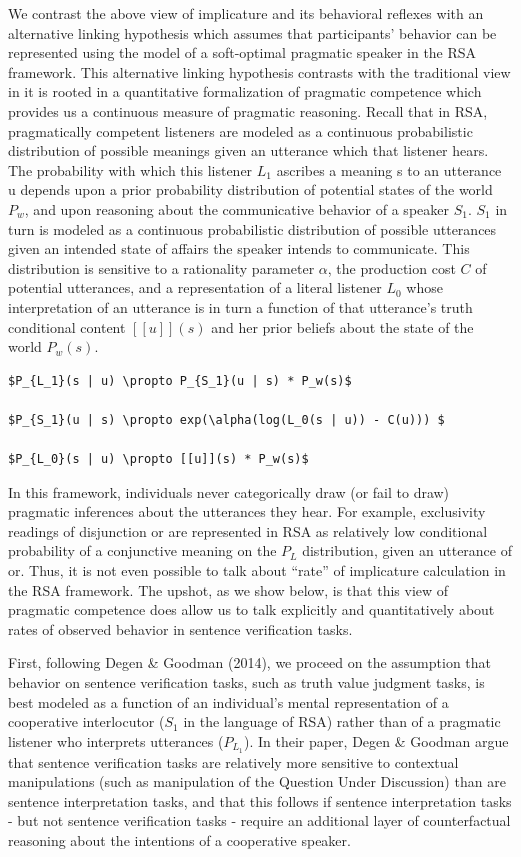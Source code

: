 \documentclass[floatsintext,man]{apa6}
\theoremstyle{definition}
\theoremstyle{definition}
\theoremstyle{definition}
\theoremstyle{remark}
\begin{document}
We contrast the above view of implicature and its behavioral reflexes
with an alternative linking hypothesis which assumes that participants'
behavior can be represented using the model of a soft-optimal pragmatic
speaker in the RSA framework. This alternative linking hypothesis
contrasts with the traditional view in it is rooted in a quantitative
formalization of pragmatic competence which provides us a continuous
measure of pragmatic reasoning. Recall that in RSA, pragmatically
competent listeners are modeled as a continuous probabilistic
distribution of possible meanings given an utterance which that listener
hears. The probability with which this listener \(L_1\) ascribes a
meaning s to an utterance u depends upon a prior probability
distribution of potential states of the world \(P_w\), and upon
reasoning about the communicative behavior of a speaker \(S_1\). \(S_1\)
in turn is modeled as a continuous probabilistic distribution of
possible utterances given an intended state of affairs the speaker
intends to communicate. This distribution is sensitive to a rationality
parameter \(\alpha\), the production cost \(C\) of potential utterances,
and a representation of a literal listener \(L_0\) whose interpretation
of an utterance is in turn a function of that utterance's truth
conditional content \([[u]](s)\) and her prior beliefs about the state
of the world \(P_w(s)\).

\begin{verbatim}
$P_{L_1}(s | u) \propto P_{S_1}(u | s) * P_w(s)$

$P_{S_1}(u | s) \propto exp(\alpha(log(L_0(s | u)) - C(u))) $

$P_{L_0}(s | u) \propto [[u]](s) * P_w(s)$
\end{verbatim}

In this framework, individuals never categorically draw (or fail to
draw) pragmatic inferences about the utterances they hear. For example,
exclusivity readings of disjunction or are represented in RSA as
relatively low conditional probability of a conjunctive meaning on the
\(P_L\) distribution, given an utterance of or. Thus, it is not even
possible to talk about \enquote{rate} of implicature calculation in the
RSA framework. The upshot, as we show below, is that this view of
pragmatic competence does allow us to talk explicitly and quantitatively
about rates of observed behavior in sentence verification tasks.

First, following Degen \& Goodman (2014), we proceed on the assumption
that behavior on sentence verification tasks, such as truth value
judgment tasks, is best modeled as a function of an individual's mental
representation of a cooperative interlocutor (\(S_1\) in the language of
RSA) rather than of a pragmatic listener who interprets utterances
(\(P_{L_1}\)). In their paper, Degen \& Goodman argue that sentence
verification tasks are relatively more sensitive to contextual
manipulations (such as manipulation of the Question Under Discussion)
than are sentence interpretation tasks, and that this follows if
sentence interpretation tasks - but not sentence verification tasks -
require an additional layer of counterfactual reasoning about the
intentions of a cooperative speaker.
\end{document}
